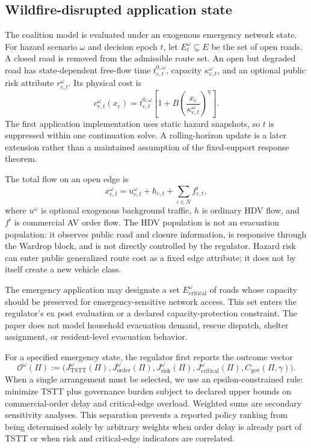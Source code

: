 \subsection{Wildfire-disrupted application state}\label{sec:model_hazard}

The coalition model is evaluated under an exogenous emergency network state. For hazard scenario $\omega$ and decision epoch $t$, let $E_t^\omega\subseteq E$ be the set of open roads. A closed road is removed from the admissible route set. An open but degraded road has state-dependent free-flow time $t_{e,t}^{0,\omega}$, capacity $\kappa_{e,t}^\omega$, and an optional public risk attribute $r_{e,t}^\omega$. Its physical cost is
\begin{equation}\label{eq:hazard-bpr}
 c_{e,t}^\omega(x_e)=t_{e,t}^{0,\omega}\left[1+B\left(\frac{x_e}{\kappa_{e,t}^\omega}\right)^\eta\right].
\end{equation}
The first application implementation uses static hazard snapshots, so $t$ is suppressed within one continuation solve. A rolling-horizon update is a later extension rather than a maintained assumption of the fixed-support response theorem.

The total flow on an open edge is
\begin{equation}\label{eq:hazard-flow-decomposition}
 x_{e,t}^\omega=u_{e,t}^\omega+h_{e,t}+\sum_{i\in N}f_{e,t}^i,
\end{equation}
where $u^\omega$ is optional exogenous background traffic, $h$ is ordinary HDV flow, and $f^i$ is commercial AV order flow. The HDV population is not an evacuation population: it observes public road and closure information, is responsive through the Wardrop block, and is not directly controlled by the regulator. Hazard risk can enter public generalized route cost as a fixed edge attribute; it does not by itself create a new vehicle class.

The emergency application may designate a set $E_{\mathrm{critical}}^\omega$ of roads whose capacity should be preserved for emergency-sensitive network access. This set enters the regulator's ex post evaluation or a declared capacity-protection constraint. The paper does not model household evacuation demand, rescue dispatch, shelter assignment, or resident-level evacuation behavior.

For a specified emergency state, the regulator first reports the outcome vector
\begin{equation}\label{eq:regulator-outcome-vector}
 \mathcal O^\omega(\Pi)
 :=\bigl(J_{\mathrm{TSTT}}^\omega(\Pi),
 J_{\mathrm{order}}^\omega(\Pi),
 J_{\mathrm{risk}}^\omega(\Pi),
 J_{\mathrm{critical}}^\omega(\Pi),
 C_{\mathrm{gov}}(\Pi,\gamma)\bigr).
\end{equation}
When a single arrangement must be selected, we use an epsilon-constrained rule: minimize TSTT plus governance burden subject to declared upper bounds on commercial-order delay and critical-edge overload. Weighted sums are secondary sensitivity analyses. This separation prevents a reported policy ranking from being determined solely by arbitrary weights when order delay is already part of TSTT or when risk and critical-edge indicators are correlated.

